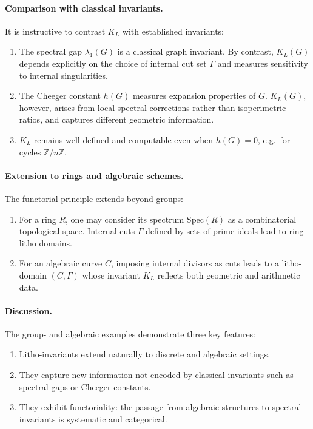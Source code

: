 \paragraph{Comparison with classical invariants.}
It is instructive to contrast $K_L$ with established invariants:
\begin{enumerate}
\item The spectral gap $\lambda_1(G)$ is a classical graph invariant.
By contrast, $K_L(G)$ depends explicitly on the choice of internal
cut set $\Gamma$ and measures sensitivity to internal singularities.
\item The Cheeger constant $h(G)$ measures expansion properties of $G$.
$K_L(G)$, however, arises from local spectral corrections rather than
isoperimetric ratios, and captures different geometric information.
\item $K_L$ remains well-defined and computable even when $h(G)=0$,
e.g.\ for cycles $\mathbb{Z}/n\mathbb{Z}$.
\end{enumerate}

\paragraph{Extension to rings and algebraic schemes.}
The functorial principle extends beyond groups:
\begin{enumerate}
\item For a ring $R$, one may consider its spectrum $\mathrm{Spec}(R)$
as a combinatorial topological space. Internal cuts $\Gamma$ defined
by sets of prime ideals lead to ring-litho domains.
\item For an algebraic curve $C$, imposing internal divisors as cuts
leads to a litho-domain $(C,\Gamma)$ whose invariant $K_L$ reflects
both geometric and arithmetic data.
\end{enumerate}

\paragraph{Discussion.}
The group- and algebraic examples demonstrate three key features:
\begin{enumerate}
\item Litho-invariants extend naturally to discrete and algebraic settings.
\item They capture new information not encoded by classical invariants
such as spectral gaps or Cheeger constants.
\item They exhibit functoriality: the passage from algebraic structures
to spectral invariants is systematic and categorical.
\end{enumerate}

